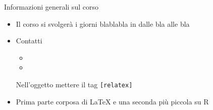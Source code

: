 \begin{frame}{Informazioni generali sul corso}
	\begin{itemize}
		\item Il corso si svolgerà i giorni blablabla in dalle bla alle bla
		\item Contatti 
		\begin{itemize}
			\item {}
			\item {}
		\end{itemize}
		Nell'oggetto mettere il tag \texttt{[relatex]}
		\item Prima parte corposa di \LaTeX{} e una seconda più piccola su R
	\end{itemize}
\end{frame}